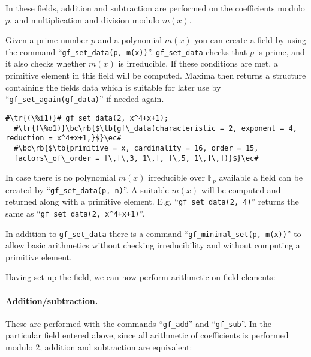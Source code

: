 \documentclass[a4paper,11pt,leqno,fleqn]{artikel3}
\newcommand{\bc}{\begin{center}}
\newcommand{\ec}{\end{center}}
\newcommand{\tr}[1]{\textcolor{red}{#1}}
\newcommand{\tb}[1]{\textcolor{blue}{#1}}
\newcommand{\rb}[1]{\raisebox{2mm}[0mm][1mm]{#1}}
\begin{document}
In these fields, addition and subtraction are performed on the coefficients
modulo $p$, and multiplication and division modulo $m(x)$.

Given a prime number $p$ and a polynomial $m(x)$ 
you can create a field by using the command ``\verb!gf_set_data(p, m(x))!''.
\verb!gf_set_data! checks that $p$ is prime, and it also checks 
whether $m(x)$ is irreducible. If these conditions are met, 
a primitive element in this field will be computed. 
Maxima then returns a structure containing the fields data which is 
suitable for later use by ``\verb!gf_set_again(gf_data)!'' if needed again.

%
\vspace*{2mm}
\begin{lstlisting}[escapechar=\#]
  #\tr{(\%i1)}# gf_set_data(2, x^4+x+1);
  #\tr{(\%o1)}\bc\rb{$\tb{gf\_data(characteristic = 2, exponent = 4, reduction = x^4+x+1,}$}\ec#
  #\bc\rb{$\tb{primitive = x, cardinality = 16, order = 15, 
  factors\_of\_order = [\,[\,3, 1\,], [\,5, 1\,]\,])}$}\ec#
\end{lstlisting}

In case there is no polynomial $m(x)$ irreducible over $\mathbb{F}_p$ available 
a field can be created by ``\verb!gf_set_data(p, n)!''. 
A suitable $m(x)$ will be computed and returned along with a primitive element. 
E.g. ``\verb!gf_set_data(2, 4)!'' returns the same as ``\verb!gf_set_data(2, x^4+x+1)!''.

In addition to \verb!gf_set_data! there is a command ``\verb!gf_minimal_set(p, m(x))!'' 
to allow basic arithmetics without checking irreducibility and 
without computing a primitive element.


\bigskip

Having set up the field, we can now perform arithmetic on field elements:


\paragraph{Addition/subtraction.}

These are performed with the commands ``\verb!gf_add!'' and ``\verb!gf_sub!''.
In the particular field entered above, since all arithmetic of coefficients is
performed modulo 2, addition and subtraction are equivalent:
\end{document}
